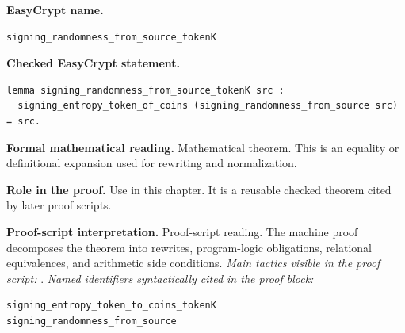 \begin{formaltheorem}
\noindent\textbf{EasyCrypt name.}
\begin{lstlisting}[language=EasyCrypt,basicstyle=\ttfamily\scriptsize]
signing_randomness_from_source_tokenK
\end{lstlisting}
\noindent\textbf{Checked EasyCrypt statement.}
\begin{lstlisting}[language=EasyCrypt,basicstyle=\ttfamily\scriptsize]
lemma signing_randomness_from_source_tokenK src :
  signing_entropy_token_of_coins (signing_randomness_from_source src) = src.
\end{lstlisting}
\noindent\textbf{Formal mathematical reading.}
Mathematical theorem. This is an equality or definitional expansion used for rewriting and normalization.

\noindent\textbf{Role in the proof.}
Use in this chapter. It is a reusable checked theorem cited by later proof scripts.

\noindent\textbf{Proof-script interpretation.}
Proof-script reading. The machine proof decomposes the theorem into rewrites, program-logic obligations, relational equivalences, and arithmetic side conditions.
\emph{Main tactics visible in the proof script:} .
\emph{Named identifiers syntactically cited in the proof block:}
\begin{lstlisting}[language=EasyCrypt,basicstyle=\ttfamily\scriptsize]
signing_entropy_token_to_coins_tokenK
signing_randomness_from_source
\end{lstlisting}

\end{formaltheorem}

